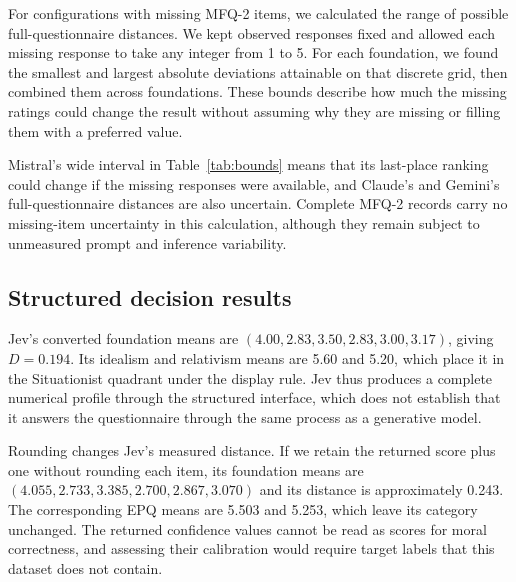 \documentclass[11pt]{article}
\begin{document}
For configurations with missing MFQ-2 items, we calculated the range of possible full-questionnaire distances. We kept observed responses fixed and allowed each missing response to take any integer from 1 to 5. For each foundation, we found the smallest and largest absolute deviations attainable on that discrete grid, then combined them across foundations. These bounds describe how much the missing ratings could change the result without assuming why they are missing or filling them with a preferred value.

\begin{table}[htbp]
\centering\small
{}
\caption{Attainable full-instrument distance bounds over all allowed completions of missing MFQ-2 ratings. Bounds are not confidence intervals.}\label{tab:bounds}
\end{table}

Mistral's wide interval in Table~\ref{tab:bounds} means that its last-place ranking could change if the missing responses were available, and Claude's and Gemini's full-questionnaire distances are also uncertain. Complete MFQ-2 records carry no missing-item uncertainty in this calculation, although they remain subject to unmeasured prompt and inference variability.

\subsection{Structured decision results}
Jev's converted foundation means are $(4.00,2.83,3.50,2.83,3.00,3.17)$, giving $D=0.194$. Its idealism and relativism means are 5.60 and 5.20, which place it in the Situationist quadrant under the display rule. Jev thus produces a complete numerical profile through the structured interface, which does not establish that it answers the questionnaire through the same process as a generative model.

Rounding changes Jev's measured distance. If we retain the returned score plus one without rounding each item, its foundation means are $(4.055,2.733,3.385,2.700,2.867,3.070)$ and its distance is approximately 0.243. The corresponding EPQ means are 5.503 and 5.253, which leave its category unchanged. The returned confidence values cannot be read as scores for moral correctness, and assessing their calibration would require target labels that this dataset does not contain.
\end{document}
